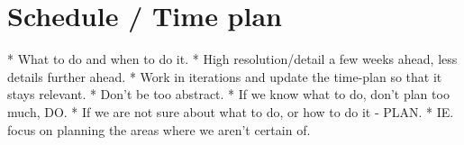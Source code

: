 


\chapter{Schedule / Time plan}
* What to do and when to do it.
* High resolution/detail a few weeks ahead, less details further ahead.
* Work in iterations and update the time-plan so that it stays relevant.
* Don't be too abstract.
* If we know what to do, don't plan too much, DO.
* If we are not sure about what to do, or how to do it - PLAN.
* IE. focus on planning the areas where we aren't certain of.
 
